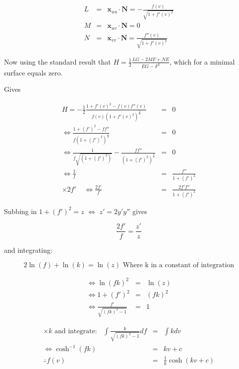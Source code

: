 \begin{eqnarray}
\nonumber
L &=& \mathbf x_{uu} \cdot \mathbf N = -\frac{f(v)}{\sqrt{1+f'(v)^2}} \\
\nonumber
M &=& \mathbf x_{uv} \cdot \mathbf N = 0 \\
\nonumber
N &=& \mathbf x_{vv} \cdot \mathbf N = \frac{f''(v)}{\sqrt{1+f'(v)^2}}
\end{eqnarray}

Now using the standard result that $H=\frac{1}{2} \frac{LG-2MF+NE}{EG-F^2}$, which for a minimal surface equals zero.

Gives

\begin{eqnarray}
\nonumber
H = -\frac{1}{2} \frac{1+f'(v)^2-f(v) f''(v)}{f(v)(1+f'(v)^2)^{\frac{3}{2}}} &=& 0 \\
\nonumber
\Leftrightarrow \frac{1+(f')^2-ff''}{f(1+(f')^2)^{\frac{3}{2}}} &=& 0 \\
\nonumber
\Leftrightarrow \frac{1}{f\sqrt{(1+(f')^2)} }-\frac{ff''}{(1+(f')^2)^{\frac{3}{2}}} &=& 0 \\
\nonumber
\Leftrightarrow \frac{1}{f}&=&\frac{f''}{1+(f')^2} \\
\nonumber
\times 2f' \ \ \ \ \ \Leftrightarrow \frac{2f'}{f}&=&\frac{2f'f''}{1+(f')^2}
\end{eqnarray}

Subbing in $1+(f')^2 = z$ $\Leftrightarrow$ $z' = 2y'y''$ gives

\begin{displaymath}
\frac{2f'}{f}=\frac{z'}{z}
\end{displaymath}

and integrating:

\begin{displaymath}
2\ln(f)+\ln(k) = \ln(z) \mbox{\ \ \ Where k in a constant of integration}
\end{displaymath}

\begin{eqnarray}
\nonumber
\Leftrightarrow \ln(fk)^2 &=& \ln(z) \\
\nonumber
\Leftrightarrow 1+(f')^2 &=& (fk)^2 \\
\nonumber
\Leftrightarrow \frac{f'}{\sqrt{(fk)^2-1}} &=& 1
\end{eqnarray}

\begin{eqnarray}
\nonumber
\times k \mbox{ and integrate:} \ \ \ \ \int \frac{k}{\sqrt{(fk)^2-1}} df &=& \int k dv \\
\nonumber
\Leftrightarrow \cosh^{-1}(fk) &=& kv + c \\
\nonumber
\therefore f(v) &=& \frac{1}{k} \cosh(kv+c)
\end{eqnarray}

